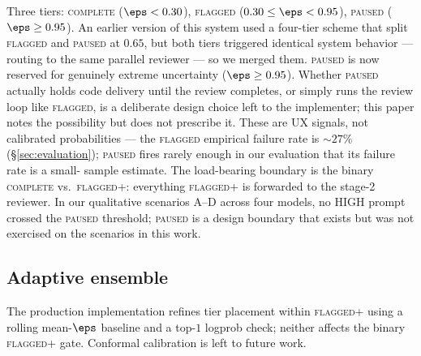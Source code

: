 Three tiers: \textsc{complete} ($\eps < 0.30$), \textsc{flagged}
($0.30 \le \eps < 0.95$), \textsc{paused} ($\eps \ge 0.95$). An
earlier version of this system used a four-tier scheme that split
\textsc{flagged} and \textsc{paused} at $0.65$, but both tiers
triggered identical system behavior --- routing to the same parallel
reviewer --- so we merged them. \textsc{paused} is now reserved for
genuinely extreme uncertainty ($\eps \ge 0.95$). Whether \textsc{%
paused} actually holds code delivery until the review completes, or
simply runs the review loop like \textsc{flagged}, is a deliberate
design choice left to the implementer; this paper notes the
possibility but does not prescribe it. These are UX signals, not
calibrated probabilities --- the \textsc{flagged} empirical failure
rate is $\sim 27\%$ (\S\ref{sec:evaluation}); \textsc{paused} fires
rarely enough in our evaluation that its failure rate is a small-%
sample estimate. The load-bearing boundary is the binary
\textsc{complete} vs.\ \textsc{flagged+}: everything \textsc{flagged+}
is forwarded to the stage-2 reviewer. In our qualitative scenarios
A--D across four models, no HIGH prompt crossed the \textsc{paused}
threshold; \textsc{paused} is a design boundary that exists but was
not exercised on the scenarios in this work.

\subsection{Adaptive ensemble}
\label{subsec:ensemble}

The production implementation refines tier placement within
\textsc{flagged+} using a rolling mean-$\eps$ baseline and a top-$1$
logprob check; neither affects the binary \textsc{flagged+} gate.
Conformal calibration is left to future work.

